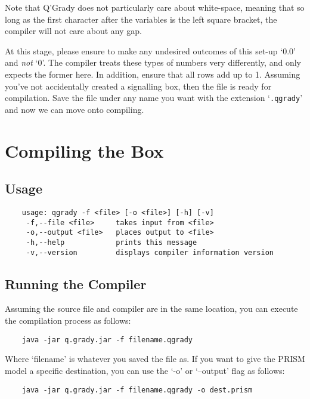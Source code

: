 \documentclass[report.tex]{subfiles}
\begin{document}
Note that Q'Grady does not particularly care about white-space, meaning that so
long as the first character after the variables is the left square bracket, the
compiler will not care about any gap.

At this stage, please ensure to make any undesired outcomes of this set-up `0.0'
and \emph{not} `0'. The compiler treats these types of numbers very differently,
and only expects the former here. In addition, ensure that all rows add up to 1.
Assuming you've not accidentally created a signalling box, then the file is
ready for compilation. Save the file under any name you want with the extension
`\texttt{.qgrady}' and now we can move onto compiling.

\section{Compiling the Box} %
\label{sec:compiling_the_box}
\subsection{Usage} %
\label{sub:usage}
\begin{lstlisting}
    usage: qgrady -f <file> [-o <file>] [-h] [-v]
     -f,--file <file>     takes input from <file>
     -o,--output <file>   places output to <file>
     -h,--help            prints this message
     -v,--version         displays compiler information version    
\end{lstlisting}

\subsection{Running the Compiler} %
\label{sub:running_the_compiler}
Assuming the source file and compiler are in the same location, you can execute
the compilation process as follows:
\begin{lstlisting}
    java -jar q.grady.jar -f filename.qgrady
\end{lstlisting}

Where `filename' is whatever you saved the file as. If you want to give the
PRISM model a specific destination, you can use the `-o' or `--output' flag as
follows:

\begin{lstlisting}
    java -jar q.grady.jar -f filename.qgrady -o dest.prism
\end{lstlisting}
\end{document}
